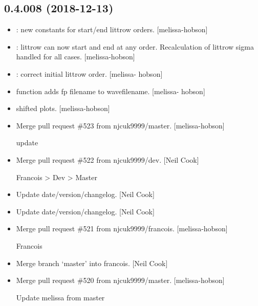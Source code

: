 \documentclass[a4paper,10pt,english]{report}
\begin{document}
\subsection{0.4.008 (2018-12-13)}
\label{\detokenize{misc/changelog:id235}}\begin{itemize}
\item {} 
: new constants for start/end littrow orders.
{[}melissa-hobson{]}

\item {} 
: littrow can now start and end at any order.
Recalculation of littrow sigma handled for all cases. {[}melissa-hobson{]}

\item {} 
: correct initial littrow order. {[}melissa-
hobson{]}

\item {} 
 function adds fp filename to wavefilename. {[}melissa-
hobson{]}

\item {} 
 shifted plots. {[}melissa-hobson{]}

\item {} 
Merge pull request \#523 from njcuk9999/master. {[}melissa-hobson{]}

update

\item {} 
Merge pull request \#522 from njcuk9999/dev. {[}Neil Cook{]}

Francois \textendash{}\textgreater{} Dev \textendash{}\textgreater{} Master

\item {} 
Update date/version/changelog. {[}Neil Cook{]}

\item {} 
Update date/version/changelog. {[}Neil Cook{]}

\item {} 
Merge pull request \#521 from njcuk9999/francois. {[}melissa-hobson{]}

Francois

\item {} 
Merge branch ‘master’ into francois. {[}Neil Cook{]}

\item {} 
Merge pull request \#520 from njcuk9999/master. {[}melissa-hobson{]}

Update melissa from master

\end{itemize}
\end{document}
